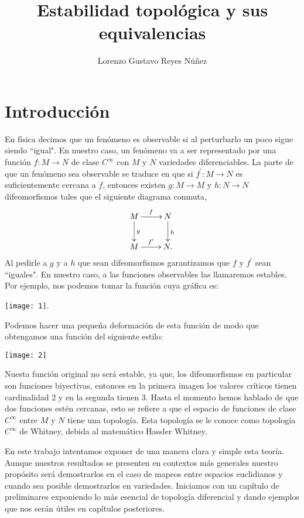 \documentclass{report}
\author{Lorenzo Gustavo Reyes N\'uñez}
\title{Estabilidad topol\'ogica y sus equivalencias}
\theoremstyle{definition}
\begin{document}


\maketitle

\tableofcontents


\chapter{Introducci\'on}


En f\'isica decimos que un fen\'omeno es observable si al perturbarlo un poco sigue siendo ``igual". En nuestro caso, un fen\'omeno va a ser representado por una funci\'on $f:M \to N$ de clase $C^\infty$ con $M$ y $N$ variedades diferenciables. La parte de que un fen\'omeno sea observable se traduce en que si $f^\prime:M \to N$ es suficientemente cercana a $f$, entonces existen $g:M \to M$ y $h:N \to N$ difeomorfismos tales que el siguiente diagrama conmuta,
$$\xymatrix{
M \ar[d]^g \ar[r]^f &N\ar[d]^h\\
M \ar[r]^{f^\prime} &N .}$$
Al pedirle a $g$ y a $h$ que sean difeomorfismos garantizamos que $f$ y $f^\prime$ sean ``iguales". En nuestro caso, a las funciones observables las llamaremos estables. Por ejemplo, nos podemos tomar la funci\'on cuya gr\'afica es:

\texttt{[image: 1]}.

Podemos hacer una pequeña deformaci\'on de esta funci\'on de modo que obtengamos una funci\'on del siguiente estilo:

\texttt{[image: 2]}

Nuesta funci\'on original no ser\'a estable, ya que, los difeomorfismos en particular son funciones biyectivas, entonces en la primera imagen los valores cr\'iticos tienen cardinalidad 2 y en la segunda tienen 3. Hasta el momento hemos hablado de que dos funciones est\'en cercanas, esto se refiere a que el espacio de funciones de clase $C^\infty$ entre $M$ y $N$ tiene una topolog\'ia. Esta topolog\'ia se le conoce como topolog\'ia $C^\infty$ de Whitney, debida al matem\'atico Hassler Whitney.

En este trabajo intentamos exponer de una manera clara y simple esta teor\'ia. Aunque nuestros resultados se presenten en contextos m\'as generales nuestro prop\'osito ser\'a demostrarlos en el caso de mapeos entre espacios euclidianos y cuando sea posible demostrarlos en variedades. Iniciamos con un cap\'itulo de preliminares exponiendo lo m\'as esencial de topolog\'ia diferencial y dando ejemplos que nos ser\'an \'utiles en cap\'itulos posteriores.
\end{document}
